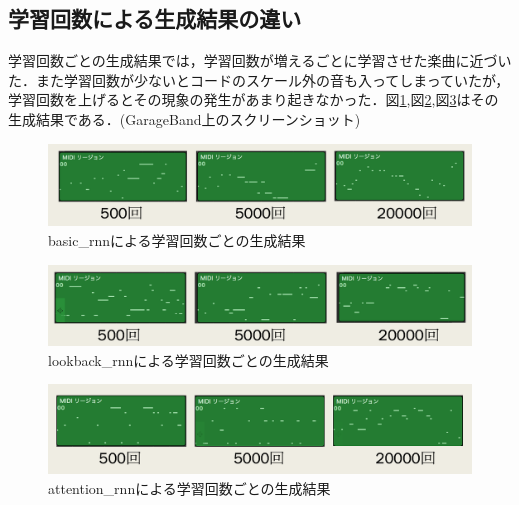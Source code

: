 \subsection{学習回数による生成結果の違い}
学習回数ごとの生成結果では，学習回数が増えるごとに学習させた楽曲に近づいた．また学習回数が少ないとコードのスケール外の音も入ってしまっていたが，学習回数を上げるとその現象の発生があまり起きなかった．図\ref{fig:basic_rnnによる学習回数ごとの生成結果},図\ref{fig:lookback_rnnによる学習回数ごとの生成結果},図\ref{fig:attention_rnnによる学習回数ごとの生成結果}はその生成結果である．(GarageBand上のスクリーンショット)
\begin{figure}[h]
    \begin{screen}
    \begin{center}
        \includegraphics[scale=0.68, clip]{./img/basicMIDI.png}
        \caption{basic\_rnnによる学習回数ごとの生成結果}
        \label{fig:basic_rnnによる学習回数ごとの生成結果}
    \end{center}
    \end{screen}
\end{figure}
\begin{figure}[h]
    \begin{screen}
    \begin{center}
        \includegraphics[scale=0.68, clip]{./img/lookbackMIDI.png}
        \caption{lookback\_rnnによる学習回数ごとの生成結果}
        \label{fig:lookback_rnnによる学習回数ごとの生成結果}
    \end{center}
    \end{screen}
\end{figure}
\begin{figure}[h]
    \begin{screen}
    \begin{center}
        \includegraphics[scale=0.68, clip]{./img/attentionMIDI.png}
        \caption{attention\_rnnによる学習回数ごとの生成結果}
        \label{fig:attention_rnnによる学習回数ごとの生成結果}
    \end{center}
    \end{screen}
\end{figure}
\newpage
